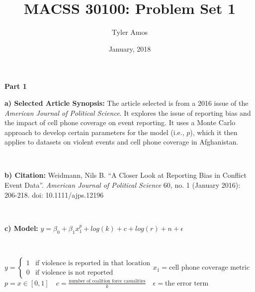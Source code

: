 \documentclass{report}
\title{\titlefont MACSS 30100: Problem Set 1}
\author{\namefont Tyler Amos}
\date{\namefont 8 January, 2018}
\newcommand{\twopartdef}[4]
{
	\left\{
		\begin{array}{ll}
			#1 & \mbox{if } #2 \\
			#3 & \mbox{if } #4
		\end{array}
	\right.
}
\begin{document}
\maketitle 
\textbf{Part 1}

\textbf{a) Selected Article Synopsis:} The article selected is from a 2016 issue of the {\it American Journal of Political Science}. It explores the issue of reporting bias and the impact of cell phone coverage on event reporting. It uses a Monte Carlo approach to develop certain parameters for the model (i.e., $p$), which it then applies to datasets on violent events and cell phone coverage in Afghanistan.

\ 

\textbf{b) Citation: }Weidmann, Nils B. ``A Closer Look at Reporting Bias in Conflict Event Data''. {\it American Journal of Political Science} 60, no. 1 (January 2016): 206-218. doi: 10.1111/ajps.12196

\


\textbf{c) Model:} $ y = \beta_0 + \beta_1 x_1^p + log(k) + c + log(r) + n + \epsilon$

\

\noindent $y = \twopartdef {1} {\text{violence is reported in that location}} {0} {\text{violence is not reported}} x_1 = \text{cell phone coverage metric}$\\
$ p = x \in [0,1]  \quad c = \frac{\text{number of coalition force casualities}} {k} \quad \epsilon = \text{the error term}$ 

\
\end{document}
